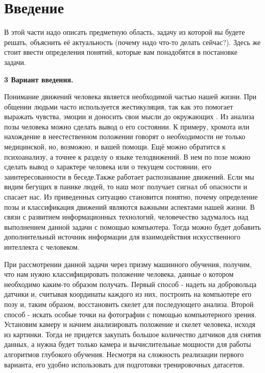 \section{Введение}
\label{sec:Chapter0} 

В этой части надо описать предметную область, задачу из которой вы будете решать, объяснить её актуальность (почему надо что-то делать сейчас?).
Здесь же стоит ввести определения понятий, которые вам понадобятся в постановке задачи.

\hfill \break
\textbf{\Large 3 Вариант введения.}

Понимание движений человека является необходимой частью нашей жизни. При общении людьми часто используется жестикуляция, так как это помогает выражать чувства, эмоции и доносить свои мысли до окружающих . Из анализа позы человека можно сделать вывод о его состоянии. К примеру, хромота или нахождение в неестественном положении говорят о необходимости не только медицинской, но, возможно, и вашей помощи. Ещё можно обратится к психоанализу, а точнее к разделу о языке телодвижений. В нем по позе можно сделать вывод о характере человека или о текущем состоянии, его заинтересованности  в беседе.Также работает распознавание движений. Если мы видим бегущих в панике людей, то наш мозг получает сигнал об опасности и спасает нас. Из приведенных ситуацию   становится  понятно, почему определение позы и классификация движений являются важными аспектами нашей жизни. В связи с развитием информационных технологий, человечество задумалось над выполнением данной задачи с помощью компьютера. Тогда можно будет добавить дополнительный источник информации для  взаимодействия искусственного интеллекта с человеком.

При рассмотрении данной задачи через призму машинного обучения, получим, что нам нужно классифицировать положение человека, данные о котором необходимо каким-то образом получать. Первый способ - надеть на добровольца датчики и, считывая координаты каждого из них, построить на компьютере его позу и, таким образом, восстановить скелет для последующего анализа. Второй способ - искать особые точки на фотографии с помощью компьютерного зрения. Установим камеру и начнем анализировать положение и скелет человека, исходя из картинки. Тогда не придется закупать большое количество датчиков для снятия данных, а нужна будет только камера и вычислительные мощности для работы алгоритмов глубокого обучения. Несмотря на сложность реализации первого варианта, его удобно использовать для подготовки тренировочных датасетов.

